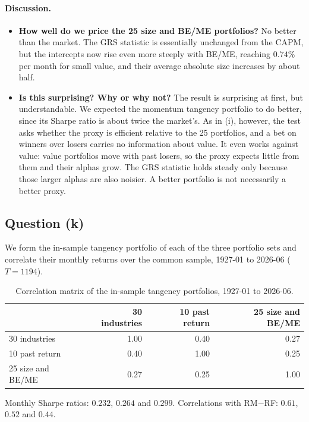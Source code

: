 \paragraph{Discussion.}
\begin{itemize}
\setlength{\itemsep}{4pt}\setlength{\parskip}{0pt}

\item \textbf{How well do we price the 25 size and BE/ME portfolios?}
No better than the market. The GRS statistic is essentially unchanged from
the CAPM, but the intercepts now rise even more steeply with BE/ME, reaching
$0.74\%$ per month for small value, and their average absolute size
increases by about half.

\item \textbf{Is this surprising? Why or why not?} The result is surprising
at first, but understandable. We expected the momentum tangency portfolio to
do better, since its Sharpe ratio is about twice the market's. As in (i),
however, the test asks whether the proxy is efficient relative
to the 25 portfolios, and a bet on winners over losers carries no
information about value. It even works against value: value portfolios move
with past losers, so the proxy expects little from them and their alphas
grow. The GRS statistic holds steady only because those larger alphas are
also noisier. A better portfolio is not necessarily a better proxy.

\end{itemize}

\subsection{Question (k)}

We form the in-sample tangency portfolio of each of the three portfolio sets
and correlate their monthly returns over the common sample, 1927-01 to
2026-06 ($T = 1194$).

\begin{table}[H]
\centering
\caption{Correlation matrix of the in-sample tangency portfolios, 1927-01 to
2026-06.}
\small
\begin{tabular}{lrrr}
\toprule
& 30 industries & 10 past return & 25 size and BE/ME \\
\midrule
30 industries & 1.00 & 0.40 & 0.27 \\
10 past return & 0.40 & 1.00 & 0.25 \\
25 size and BE/ME & 0.27 & 0.25 & 1.00 \\
\bottomrule
\end{tabular}
\label{tab:p3k}
\vspace{2pt}\begin{minipage}{0.93\textwidth}\footnotesize
Monthly Sharpe ratios: $0.232$, $0.264$ and $0.299$. Correlations with
RM$-$RF: $0.61$, $0.52$ and $0.44$.
\end{minipage}
\end{table}

